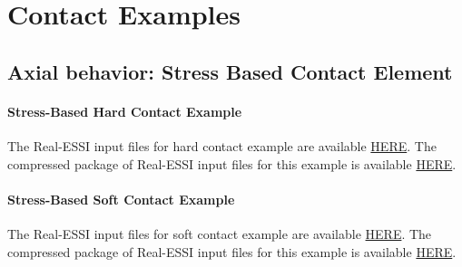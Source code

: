 







\clearpage
\newpage
\section{Contact Examples}
\label{Contact_Examples}
\subsection{ Axial behavior: Stress Based Contact Element}


\paragraph{Stress-Based Hard Contact Example}
The Real-ESSI input files for hard contact example are available 
\href{http://cml01.engr.ucdavis.edu/shortCourse/Day3/Contact_Examples/axial/HardContact_Elastic_Perfectly_Plastic_Shear_Model}{HERE}. 
The compressed package of Real-ESSI input files for this example is available 
\href{http://cml01.engr.ucdavis.edu/shortCourse/Day3/Contact_Examples/axial/HardContact_Elastic_Perfectly_Plastic_Shear_Model/HardContact_Elastic_Perfectly_Plastic_Shear_Model.tgz}{HERE}. 

\paragraph{Stress-Based Soft Contact Example}
The Real-ESSI input files for soft contact example are available 
\href{http://cml01.engr.ucdavis.edu/shortCourse/Day3/Contact_Examples/axial/SoftContact_Elastic_Perfectly_Plastic_Shear_Model}{HERE}. 
The compressed package of Real-ESSI input files for this example is available 
\href{http://cml01.engr.ucdavis.edu/shortCourse/Day3/Contact_Examples/axial/SoftContact_Elastic_Perfectly_Plastic_Shear_Model/SoftContact_Elastic_Perfectly_Plastic_Shear_Model.tgz}{HERE}. 


